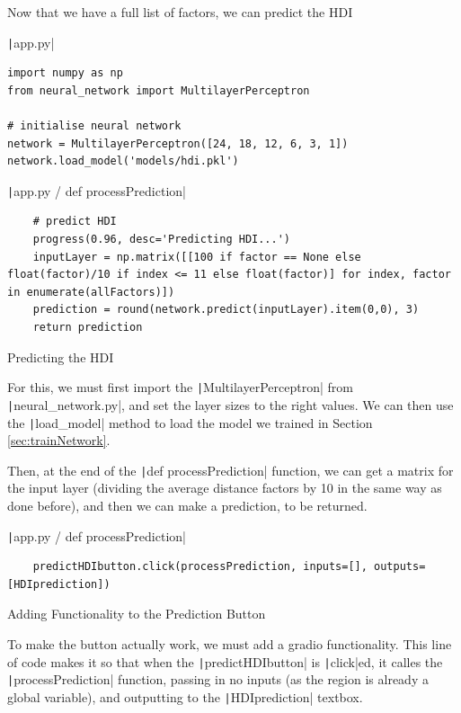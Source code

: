 \documentclass[12pt]{report}
\newcommand{\pil}[1]{\protect\texttt|#1|}
\begin{document}
Now that we have a full list of factors, we can predict the HDI

\begin{listing}[H]
\pil{app.py}
\begin{verbatim}
import numpy as np
from neural_network import MultilayerPerceptron

# initialise neural network
network = MultilayerPerceptron([24, 18, 12, 6, 3, 1])
network.load_model('models/hdi.pkl')
\end{verbatim}
\pil{app.py / def processPrediction}
\begin{verbatim}
    # predict HDI
    progress(0.96, desc='Predicting HDI...')
    inputLayer = np.matrix([[100 if factor == None else float(factor)/10 if index <= 11 else float(factor)] for index, factor in enumerate(allFactors)])
    prediction = round(network.predict(inputLayer).item(0,0), 3)
    return prediction
\end{verbatim}
\caption{Predicting the HDI}\label{cs:predictingHDI}
\end{listing}

For this, we must first import the \pil{MultilayerPerceptron} from \pil{neural_network.py}, and set the layer sizes to the right values. We can then use the \pil{load_model} method to load the model we trained in Section \ref{sec:trainNetwork}.

Then, at the end of the \pil{def processPrediction} function, we can get a matrix for the input layer (dividing the average distance factors by 10 in the same way as done before), and then we can make a prediction, to be returned. 

\begin{listing}[H]
\pil{app.py / def processPrediction}
\begin{verbatim}
    predictHDIbutton.click(processPrediction, inputs=[], outputs=[HDIprediction])
\end{verbatim}
\caption{Adding Functionality to the Prediction Button}\label{cs:predictionButton}
\end{listing}

To make the button actually work, we must add a gradio functionality. This line of code makes it so that when the \pil{predictHDIbutton} is \pil{click}ed, it calles the \pil{processPrediction} function, passing in no inputs (as the region is already a global variable), and outputting to the \pil{HDIprediction} textbox.
\end{document}
